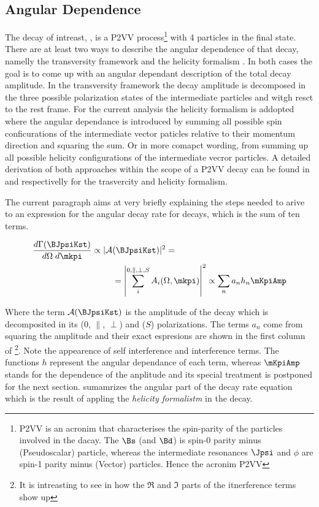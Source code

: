 \subsection{Angular Dependence}
\label{Diferential_Decay_Rate}
The decay of intreast, \BJpsiKst, is a P2VV process\footnote{P2VV is an acronim that characterises the spin-parity of the particles involved in the dacay.
The $\Bs$ (and $\Bd$) is spin-0 parity minus (Pseudoscalar) particle, whereas the intermediate resonances $\Jpsi$ and $\phi$ are spin-1 parity minus (Vector) particles. Hence the
acronim P2VV} with 4 particles in the final state. There are at least two ways to describe the angular dependence of that decay, namelly the transversity framework \cite{transvFrameworkI,transvFrameworkII}
and the helicity formalism \cite{helicityFormI,helicityFormII}. In both cases the goal is to come up with an angular dependant description of the total decay amplitude.
In the transversity framework the decay amplitude is decomposed in the three possible polarization states of the intermediate particles \Jpsi and \Kst witgh resct to the \Bs rest frame. For the current analysis the helicity
formalism is addopted where the angular dependance is introduced by summing all possible spin conficurations of the intermediate vector paticles relative to their 
momentum direction and squaring the sum. Or in more comapct wording, from summing up all possible helicity configurations of the intermediate vecror particles. A detailed derivation of both 
approaches within the scope of a P2VV decay can be found in \cite{daanThesis} and \cite{jeroenThesis} respectivelly for the trasvercity and helicity formalism.
 
The current paragraph aims at very briefly explaining the steps needed to arive to an expression for the angular decay rate for \BsJpsiKst decays, which is the sum of ten terms.  

\begin{align}
  \frac{d\Gamma(\text{\BJpsiKst})}{d\Omega\;d\mkpi} \propto |\mathcal{A}&(\text{\BJpsiKst})|^2 = \nonumber \\
                                                    &= \left| \sum_i^{0,\parallel,\perp,S} A_i(\Omega,\mkpi) \right|^2  \propto \sum_n a_n h_n \mKpiAmp
  \label{ang_terms}
\end{align}

\noindent Where the term $\mathcal{A}(\text{\BJpsiKst})$ is the amplitude of the decay which is decomposited in its \pwave ($0$, $\parallel$, $\perp$) and \swave ($S$) polarizations.
The terms $a_n$ come from squaring the amplitude and their exact espresions are shown in the first column of 
\footnote{It is intreasting to see in \cite{jeroen_thesis} how the $\Re$ and $\Im$ parts of the itnerference terms show up}. 
Note the appearence of \pwave self interference and \spwave interference terms. The functions $h$ represent the angular dependance of each term, whereas $\mKpiAmp$ stands 
for the \mkpi dependence of the anplitude and its special treatment is postponed for the next section.  sumamrizes the angular part of the decay rate
equation which is the result of appling the \emph{helicity formalistm} in the \BJpsiKst decay.

